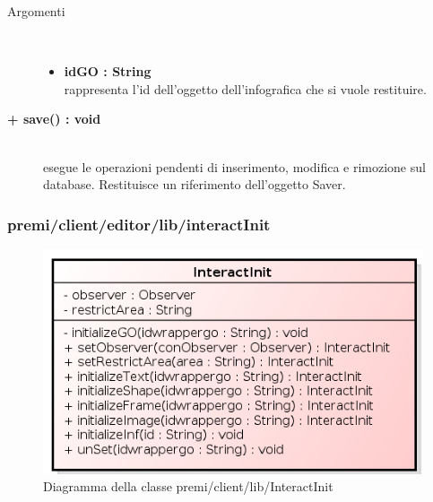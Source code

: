 \begin{description}
\begin{description}
\begin{description}
			\item[Argomenti] \hfill \\
				\begin{itemize}
					\item \textbf{idGO : String			} \hfill \\
					rappresenta l'id dell'oggetto dell'infografica che si vuole restituire. 
				\end{itemize}

\end{description}

\end{description}

\begin{description} 
		\item[\textbf{\color{blue}+ save() : void			}] \hfill \\
			esegue le operazioni pendenti di inserimento, modifica e rimozione sul database. Restituisce un riferimento dell'oggetto Saver.

\end{description}



\end{description}


\subsubsection{premi/client/editor/lib/interactInit}
\begin{figure}[h]
\begin{center}
\includegraphics[scale=0.90]{img/diacla/InteractInit.png}
\caption{Diagramma della classe premi/client/lib/InteractInit}
\end{center}
\end{figure}

